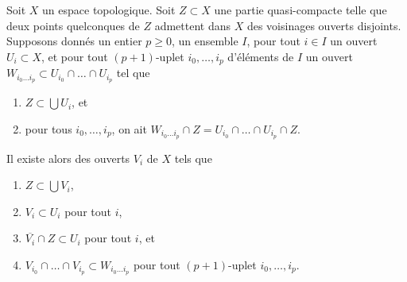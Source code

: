 \begin{lemma}
\label{lemma-lift-covering-of-quasi-compact-hausdorff-subset}
Soit $X$ un espace topologique. Soit $Z \subset X$ une partie quasi-compacte
telle que deux points quelconques de $Z$ admettent dans $X$ des voisinages
ouverts disjoints. Supposons donnés un entier $p \geq 0$, un ensemble $I$,
pour tout $i \in I$ un ouvert $U_i \subset X$, et pour tout $(p + 1)$-uplet
$i_0, \ldots, i_p$ d'éléments de $I$ un ouvert
$W_{i_0 \ldots i_p} \subset U_{i_0} \cap \ldots \cap U_{i_p}$
tel que
\begin{enumerate}
\item $Z \subset \bigcup U_i$, et
\item pour tous $i_0, \ldots, i_p$, on ait
$W_{i_0 \ldots i_p} \cap Z = U_{i_0} \cap \ldots \cap U_{i_p} \cap Z$.
\end{enumerate}
Il existe alors des ouverts $V_i$ de $X$ tels que
\begin{enumerate}
\item $Z \subset \bigcup V_i$,
\item $V_i \subset U_i$ pour tout $i$,
\item $\overline{V_i} \cap Z \subset U_i$ pour tout $i$, et
\item $V_{i_0} \cap \ldots \cap V_{i_p} \subset W_{i_0 \ldots i_p}$
pour tout $(p + 1)$-uplet $i_0, \ldots, i_p$.
\end{enumerate}
\end{lemma}

